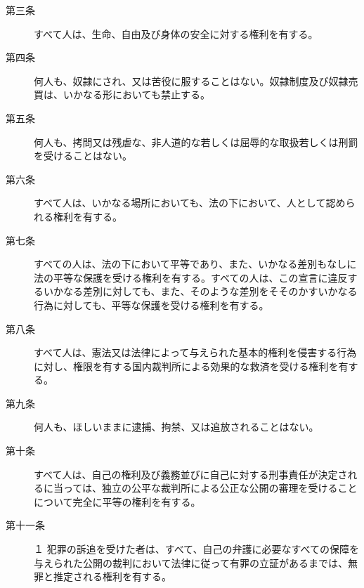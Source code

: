 \begin{description}
\item[第三条]



すべて人は、生命、自由及び身体の安全に対する権利を有する。

\item[第四条]



何人も、奴隷にされ、又は苦役に服することはない。奴隷制度及び奴隷売買は、いかなる形においても禁止する。

\item[第五条]



何人も、拷問又は残虐な、非人道的な若しくは屈辱的な取扱若しくは刑罰を受けることはない。

\item[第六条]



すべて人は、いかなる場所においても、法の下において、人として認められる権利を有する。

\item[第七条]



すべての人は、法の下において平等であり、また、いかなる差別もなしに法の平等な保護を受ける権利を有する。すべての人は、この宣言に違反するいかなる差別に対しても、また、そのような差別をそそのかすいかなる行為に対しても、平等な保護を受ける権利を有する。

\item[第八条]



すべて人は、憲法又は法律によって与えられた基本的権利を侵害する行為に対し、権限を有する国内裁判所による効果的な救済を受ける権利を有する。

\item[第九条]



何人も、ほしいままに逮捕、拘禁、又は追放されることはない。

\item[第十条]



すべて人は、自己の権利及び義務並びに自己に対する刑事責任が決定されるに当っては、独立の公平な裁判所による公正な公開の審理を受けることについて完全に平等の権利を有する。

\item[第十一条]


\noindent{}１ 犯罪の訴追を受けた者は、すべて、自己の弁護に必要なすべての保障を与えられた公開の裁判において法律に従って有罪の立証があるまでは、無罪と推定される権利を有する。


\end{description}
